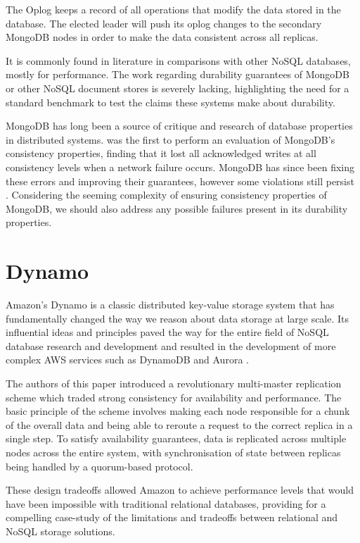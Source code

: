 The Oplog keeps a record of all operations that modify the data stored in the database. The elected leader will push its oplog changes to the secondary MongoDB nodes in order to make the data consistent across all replicas.

It is commonly found in literature in comparisons with other NoSQL databases, mostly for performance. The work regarding durability guarantees of MongoDB or other NoSQL document stores is severely lacking, highlighting the need for a standard benchmark to test the claims these systems make about durability.

MongoDB has long been a source of critique and research of database properties in distributed systems. \citet{jepsen-2013} was the first to perform an evaluation of MongoDB's consistency properties, finding that it lost all acknowledged writes at all consistency levels when a network failure occurs. MongoDB has since been fixing these errors and improving their guarantees, however some violations still persist \citep{jepsen-2018}. Considering the seeming complexity of ensuring consistency properties of MongoDB, we should also address any possible failures present in its durability properties.

\section{Dynamo}
Amazon's Dynamo \citep{dynamo} is a classic distributed key-value storage system that has fundamentally changed the way we reason about data storage at large scale. Its influential ideas and principles paved the way for the entire field of NoSQL database research and development and resulted in the development of more complex AWS services such as DynamoDB \citep{dynamodb} and Aurora \citep{aurora}.

The authors of this paper introduced a revolutionary multi-master replication scheme which traded strong consistency for availability and performance. The basic principle of the scheme involves making each node responsible for a chunk of the overall data and being able to reroute a request to the correct replica in a single step. To satisfy availability guarantees, data is replicated across multiple nodes across the entire system, with synchronisation of state between replicas being handled by a quorum-based protocol.

These design tradeoffs allowed Amazon to achieve performance levels that would have been impossible with traditional relational databases, providing for a compelling case-study of the limitations and tradeoffs between relational and NoSQL storage solutions.

